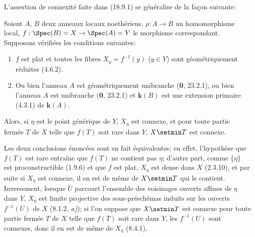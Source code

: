 L'assertion de connexité faite dans (18.9.1) se généralise de la façon suivante:

\begin{theorem}[18.9.7]
\label{IV.18.9.7}
Soient $A$, $B$ deux anneaux locaux noethériens, $\rho:A\to B$ un homomorphisme local, $f:\Spec(B)=X\to\Spec(A)=Y$ le morphisme correspondant. Supposons vérifiées les conditions suivantes:
\begin{enumerate}
  \item[\textup{(i)}] $f$ est plat et toutes les fibres $X_y=f^{-1}(y)$ \textup{(}$y\in Y$\textup{)} sont géométriquement réduites \textup{(4.6.2)}.
  \item[\textup{(ii)}] \textup{Ou bien} l'anneau $A$ est géométriquement unibranche \textup{(\textbf{0}, 23.2.1), ou bien} l'anneau $A$ est unibranche \textup{(\textbf{0}, 23.2.1)} et $\boldsymbol{k}(B)$ est une extension primaire \textup{(4.3.1)} de $\boldsymbol{k}(A)$.
\end{enumerate}

Alors, si $\eta$ est le point générique de $Y$, $X_\eta$ est connexe, et pour toute partie fermée $T$ de $X$ telle que $f(T)$ soit rare dans $Y$, $X\setmin T$ est connexe.
\end{theorem}

Les deux conclusions énoncées sont en fait équivalentes; en effet, l'hypothèse que $f(T)$ est rare entraîne que $\overline{f(T)}$ ne contient pas $\eta$; d'autre part, comme $\{\eta\}$ est proconstructible (1.9.6) et que $f$ est plat, $X_\eta$ est dense dans $X$ (2.3.10), et par suite si $X_\eta$ est connexe, il en est de même de $X\setmin T$ qui le contient. Inversement, lorsque $U$ parcourt l'ensemble des voisinages ouverts affines de $\eta$ dans $Y$, $X_\eta$ est limite projective des sous-préschémas induits sur les ouverts $f^{-1}(U)$ de $X$ (8.1.2, \emph{a)}); si l'on suppose que $X\setmin T$ est connexe pour toute partie fermée $T$ de $X$ telle que $f(T)$ soit rare dans $Y$, les $f^{-1}(U)$ sont connexes, donc il en est de même de $X_\eta$ (8.4.1).


